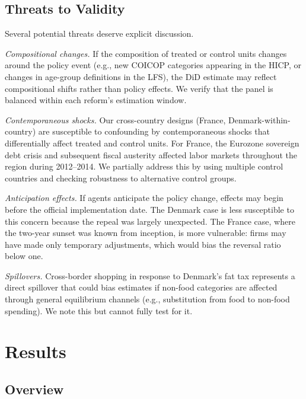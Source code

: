 \documentclass[12pt]{article}
\begin{document}
\subsection{Threats to Validity}

Several potential threats deserve explicit discussion.

\textit{Compositional changes.} If the composition of treated or control units changes around the policy event (e.g., new COICOP categories appearing in the HICP, or changes in age-group definitions in the LFS), the DiD estimate may reflect compositional shifts rather than policy effects. We verify that the panel is balanced within each reform's estimation window.

\textit{Contemporaneous shocks.} Our cross-country designs (France, Denmark-within-country) are susceptible to confounding by contemporaneous shocks that differentially affect treated and control units. For France, the Eurozone sovereign debt crisis and subsequent fiscal austerity affected labor markets throughout the region during 2012--2014. We partially address this by using multiple control countries and checking robustness to alternative control groups.

\textit{Anticipation effects.} If agents anticipate the policy change, effects may begin before the official implementation date. The Denmark case is less susceptible to this concern because the repeal was largely unexpected. The France case, where the two-year sunset was known from inception, is more vulnerable: firms may have made only temporary adjustments, which would bias the reversal ratio below one.

\textit{Spillovers.} Cross-border shopping in response to Denmark's fat tax represents a direct spillover that could bias estimates if non-food categories are affected through general equilibrium channels (e.g., substitution from food to non-food spending). We note this but cannot fully test for it.


\section{Results}
\label{sec:results}

\subsection{Overview}
\end{document}

